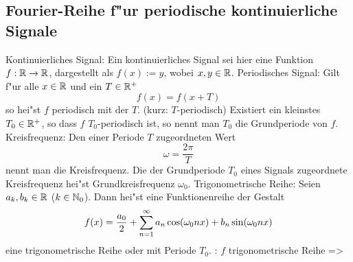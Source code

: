 \subsection{Fourier-Reihe f"ur periodische kontinuierliche Signale}
 Kontinuierliches Signal:{
  Ein kontinuierliches Signal sei hier eine Funktion $f:\mathbb R\to\mathbb R$, 
  dargestellt als $f(x):=y$, wobei $x,y\in\mathbb R$.
}
 Periodisches Signal:{
  Gilt f"ur alle $x\in\mathbb R$ und ein $T\in\mathbb R^+$
  \[
    f(x)=f(x+T)
  \]
  so hei"st $f$ periodisch mit der  $T$.
  (kurz: $T$-periodisch) Existiert ein kleinstes $T_0\in\mathbb R^+$, so dass
  $f$ $T_0$-periodisch ist, so nennt man $T_0$ die Grundperiode von $f$.
}
 Kreisfrequenz:{
  Den einer Periode $T$ zugeordneten Wert
  \[
    \omega=\frac{2\pi}T
  \]
  nennt man die Kreisfrequenz. Die der Grundperiode $T_0$ eines Signals
  zugeordnete Kreisfrequenz hei"st Grundkreisfrequenz $\omega_0$.
}
 Trigonometrische Reihe:{
  Seien $a_k,b_k\in\mathbb R$ ($k\in\mathbb N_0$). Dann hei"st eine Funktionenreihe
  der Gestalt
  \[
    f(x)=\frac{a_0}2+\sumn 1 a_n \cos(\omega_0 nx) + b_n \sin(\omega_0 nx)
  \]
  eine trigonometrische Reihe oder  mit Periode $T_0$.
}
\theorem:
  $f$ trigonometrische Reihe
  =>

